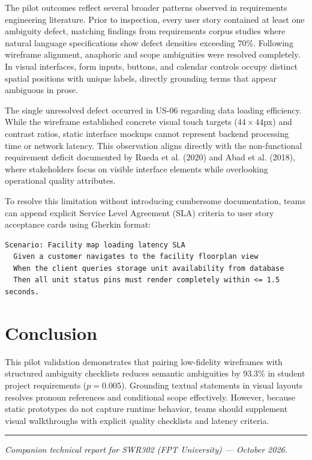 \documentclass[11pt,a4paper]{article}
\begin{document}
The pilot outcomes reflect several broader patterns observed in requirements engineering literature. Prior to inspection, every user story contained at least one ambiguity defect, matching findings from requirements corpus studies where natural language specifications show defect densities exceeding 70\%. Following wireframe alignment, anaphoric and scope ambiguities were resolved completely. In visual interfaces, form inputs, buttons, and calendar controls occupy distinct spatial positions with unique labels, directly grounding terms that appear ambiguous in prose.

The single unresolved defect occurred in US-06 regarding data loading efficiency. While the wireframe established concrete visual touch targets ($44 \times 44$px) and contrast ratios, static interface mockups cannot represent backend processing time or network latency. This observation aligns directly with the non-functional requirement deficit documented by Rueda et al. (2020) and Abad et al. (2018), where stakeholders focus on visible interface elements while overlooking operational quality attributes.

To resolve this limitation without introducing cumbersome documentation, teams can append explicit Service Level Agreement (SLA) criteria to user story acceptance cards using Gherkin format:
\begin{lstlisting}[basicstyle=\ttfamily\scriptsize, frame=single, backgroundcolor=\color{gray!10}]
Scenario: Facility map loading latency SLA
  Given a customer navigates to the facility floorplan view
  When the client queries storage unit availability from database
  Then all unit status pins must render completely within <= 1.5 seconds.
\end{lstlisting}

\section{Conclusion}

This pilot validation demonstrates that pairing low-fidelity wireframes with structured ambiguity checklists reduces semantic ambiguities by 93.3\% in student project requirements ($p = 0.005$). Grounding textual statements in visual layouts resolves pronoun references and conditional scope effectively. However, because static prototypes do not capture runtime behavior, teams should supplement visual walkthroughs with explicit quality checklists and latency criteria.

\vspace{1.5em}
\hrule
\vspace{1em}
\begin{center}
\footnotesize \textit{Companion technical report for SWR302 (FPT University) --- October 2026.}
\end{center}
\end{document}
